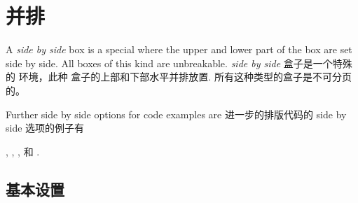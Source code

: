 \section{并排}\label{sec:sidebyside}%
%
\begin{stripedbox}
A \emph{side by side} box is a special  where
the upper and lower part of the box are set side by side.
All boxes of this kind are unbreakable.
\tcblower
\emph{side by side} 盒子是一个特殊的  环境，此种
盒子的上部和下部水平并排放置.
所有这种类型的盒子是不可分页的。
\end{stripedbox}

\begin{marker}
\begin{stripedbox}
Further side by side options for code examples are
\tcblower
进一步的排版代码的 side by side 选项的例子有
\end{stripedbox}

,
,
, 和
.
\end{marker}

\subsection{基本设置}\label{subsec:sidebyside_basic}

